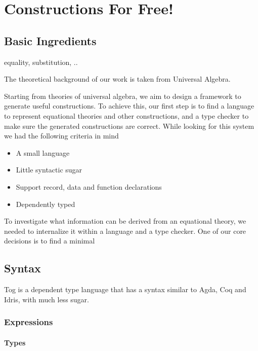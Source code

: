 \chapter{Constructions For Free!}
\label{ch:generation}


\section{Basic Ingredients}
equality, substitution, .. 

The theoretical background of our work is taken from Universal Algebra. 

Starting from theories of universal algebra, we aim to design a framework to generate useful constructions. To achieve this, our first step is to find a language to represent equational theories and other constructions, and a type checker to make sure the generated constructions are correct. While looking for this system we had the following criteria in mind 

\begin{itemize}
 \item A small language 
 \item Little syntactic sugar 
 \item Support record, data and function declarations 
 \item Dependently typed 
\end{itemize}


To investigate what information can be derived from an equational theory, we needed to internalize it within a language and a type checker. One of our core decisions is to find a minimal

\section{Syntax}
Tog is a dependent type language that has a syntax similar to Agda, Coq and Idris, with much less sugar. 
\subsection{Expressions}
\subsubsection{Types}

